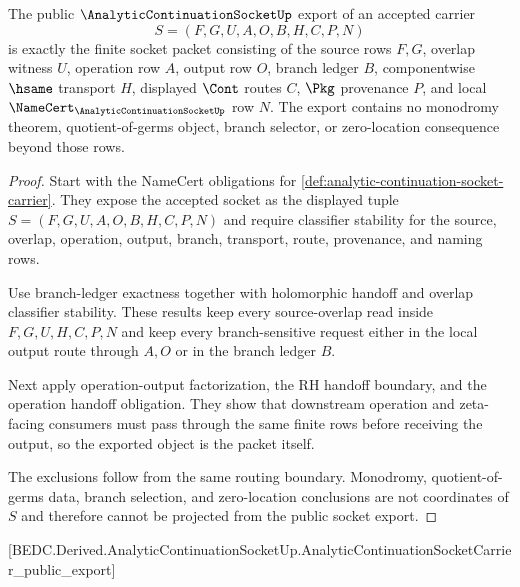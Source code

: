 \begin{theorem}
\label{thm:analytic-continuation-socket-public-export}
The public $\AnalyticContinuationSocketUp$ export of an accepted carrier
$$
S=(F,G,U,A,O,B,H,C,P,N)
$$
is exactly the finite socket packet consisting of the source rows $F,G$, overlap witness $U$, operation row $A$, output row $O$, branch ledger $B$, componentwise $\hsame$ transport $H$, displayed $\Cont$ routes $C$, $\Pkg$ provenance $P$, and local $\NameCert_{\AnalyticContinuationSocketUp}$ row $N$. The export contains no monodromy theorem, quotient-of-germs object, branch selector, or zero-location consequence beyond those rows.
\end{theorem}
\begin{proof}
Start with the NameCert obligations for \autoref{def:analytic-continuation-socket-carrier}. They expose the accepted socket as the displayed tuple $S=(F,G,U,A,O,B,H,C,P,N)$ and require classifier stability for the source, overlap, operation, output, branch, transport, route, provenance, and naming rows.

Use branch-ledger exactness together with holomorphic handoff and overlap classifier stability. These results keep every source-overlap read inside $F,G,U,H,C,P,N$ and keep every branch-sensitive request either in the local output route through $A,O$ or in the branch ledger $B$.

Next apply operation-output factorization, the RH handoff boundary, and the operation handoff obligation. They show that downstream operation and zeta-facing consumers must pass through the same finite rows before receiving the output, so the exported object is the packet itself.

The exclusions follow from the same routing boundary. Monodromy, quotient-of-germs data, branch selection, and zero-location conclusions are not coordinates of $S$ and therefore cannot be projected from the public socket export.
\end{proof}

[BEDC.Derived.AnalyticContinuationSocketUp.AnalyticContinuationSocketCarrier\_public\_export]

